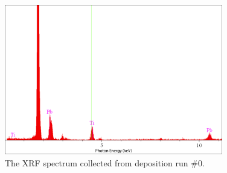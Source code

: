 
\begin{figure}[htbp]
	\centering
	\includegraphics[width=0.85\textwidth]{./Figures/Appendix/Composition/PTO-run0-pre-anneal.png}
	\caption[XRF Spectrum of PTO \#0]%
		     {The XRF spectrum collected from deposition run \#0.  }
	\label{fig:XRF-0-SiO2}
\end{figure}

